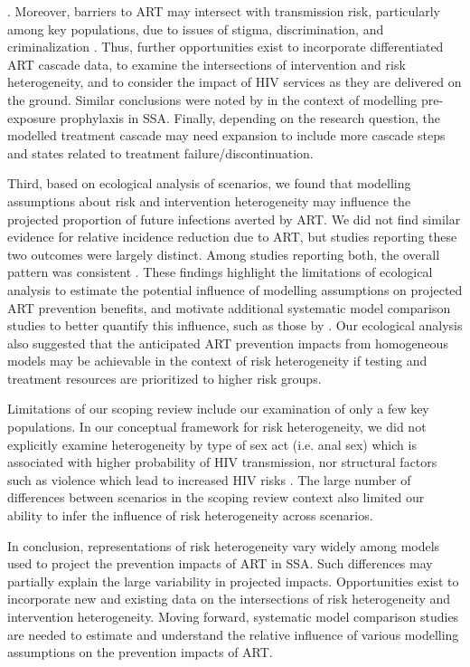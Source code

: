 \cite{Chikwari2018,Ehrenkranz2019}.
Moreover, barriers to ART may intersect with transmission risk, particularly among key populations,
due to issues of stigma, discrimination, and criminalization \cite{Ortblad2019,Baral2019}.
Thus, further opportunities exist to incorporate differentiated ART cascade data,
to examine the intersections of intervention and risk heterogeneity, and
to consider the impact of HIV services as they are delivered on the ground.
Similar conclusions were noted by \citet{Case2019}
in the context of modelling pre-exposure prophylaxis in SSA.
Finally, depending on the research question, the modelled treatment cascade may need expansion
to include more cascade steps and states related to treatment failure/discontinuation.
\par
Third, based on ecological analysis of scenarios, we found that
modelling assumptions about risk and intervention heterogeneity
may influence the projected proportion of future infections averted by ART.
We did not find similar evidence for relative incidence reduction due to ART,
but studies reporting these two outcomes were largely distinct.
Among studies reporting both, the overall pattern was consistent
\cite{Salomon2005,Abbas2006,Pretorius2010,Nichols2014,Barnighausen2016,Maheu-Giroux2017,Akudibillah2018}.
These findings highlight the limitations of ecological analysis to estimate
the potential influence of modelling assumptions on projected ART prevention benefits,
and motivate additional systematic model comparison studies to better quantify this influence,
such as those by \citet{Dodd2010,Hontelez2013}.
Our ecological analysis also suggested that the anticipated ART prevention impacts from homogeneous models
may be achievable in the context of risk heterogeneity
if testing and treatment resources are prioritized to higher risk groups.
\par
Limitations of our scoping review include our examination of only a few key populations.
In our conceptual framework for risk heterogeneity, we did not explicitly examine heterogeneity
by type of sex act (i.e. anal sex) which is associated with higher probability of HIV transmission,
nor structural factors such as violence which lead to increased HIV risks \cite{Silverman2011,Baggaley2013}.
The large number of differences between scenarios in the scoping review context
also limited our ability to infer the influence of risk heterogeneity across scenarios.
\par
In conclusion, representations of risk heterogeneity vary widely
among models used to project the prevention impacts of ART in SSA.
Such differences may partially explain the large variability in projected impacts.
Opportunities exist to incorporate new and existing data on
the intersections of risk heterogeneity and intervention heterogeneity.
Moving forward, systematic model comparison studies are needed to
estimate and understand the relative influence of various modelling assumptions on the prevention impacts of ART.
